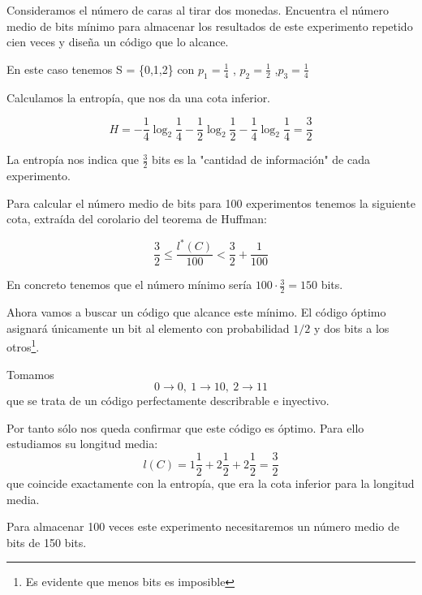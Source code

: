 \begin{problem}[5]
Consideramos el número de caras al tirar dos monedas. Encuentra el número medio de bits mínimo para almacenar los resultados de este experimento repetido cien veces y diseña un código que lo alcance.
\solution

En este caso tenemos S = \{0,1,2\} con $p_1 = \frac{1}{4}$ , $p_2 = \frac{1}{2}$ ,$p_3 = \frac{1}{4}$

	Calculamos la entropía, que nos da una cota inferior.

	$$H = - \frac{1}{4} \log_2 \frac{1}{4} - \frac{1}{2}\log_2 \frac{1}{2}  - \frac{1}{4} \log_2 \frac{1}{4} = \frac{3}{2}$$

	La entropía nos indica que $\frac{3}{2}$ bits es la "cantidad de información" de cada experimento.

	Para calcular el número medio de bits para 100 experimentos tenemos la siguiente cota, extraída del corolario del teorema de Huffman:

	$$\frac{3}{2} \leq \frac{l^{*}(C)}{100} < \frac{3}{2} + \frac{1}{100}$$

	En concreto tenemos que el número mínimo sería $100 \cdot \frac{3}{2} = 150$ bits.

	Ahora vamos a buscar un código que alcance este mínimo. El código óptimo asignará únicamente un bit al elemento con probabilidad $1/2$ y dos bits a los otros\footnote{Es evidente que menos bits es imposible}.

	Tomamos
	\[0 \to 0, \ 1\to 10, \ 2\to 11\]
	que se trata de un código perfectamente describrable e inyectivo.

	Por tanto sólo nos queda confirmar que este código es óptimo. Para ello estudiamos su longitud media:
	\[l(C)=1\frac{1}{2}+2\frac{1}{2}+2\frac{1}{2} = \frac{3}{2}\]
	que coincide exactamente con la entropía, que era la cota inferior para la longitud media.

	Para almacenar 100 veces este experimento necesitaremos un número medio de bits de 150 bits.

\end{problem}

